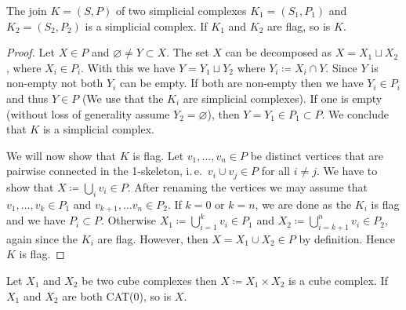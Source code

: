 \begin{lemma}
  \label{lem:flag}
  The join \(K = (S,P)\) of two simplicial complexes \(K_1 = (S_1, P_1)\) and \(K_2 = (S_2, P_2)\) is a simplicial complex. If \(K_1\) and \(K_2\) are flag, so is \(K\).
\end{lemma}

\begin{proof}
  Let \(X \in P\) and \(\varnothing \neq Y \subset X\). The set \(X\) can be decomposed as \(X = X_1 \sqcup X_2\), where \(X_i \in P_i\). With this we have \(Y = Y_1 \sqcup Y_2\) where \(Y_i \coloneqq X_i \cap Y\). Since \(Y\) is non-empty not both \(Y_i\) can be empty. If both are non-empty then we have \(Y_i \in P_i\) and thus \(Y \in P\) (We use that the \(K_i\) are simplicial complexes). If one is empty (without loss of generality assume \(Y_2 = \varnothing\)), then \(Y = Y_1 \in P_1 \subset P\). We conclude that \(K\) is a simplicial complex.

  We will now show that \(K\) is flag. Let \(v_1, \dots, v_n \in P\) be distinct vertices that are pairwise connected in the 1-skeleton, i.\,e.\ \(v_i \cup v_j \in P\) for all \(i \neq j\). We have to show that \(X \coloneqq \bigcup_i v_i \in P\). After renaming the vertices we may assume that \(v_1, \dots, v_k \in P_1\) and \(v_{k+1}, \dots v_{n} \in P_2\). If \(k=0\) or \(k=n\), we are done as the \(K_i\) is flag and we have \(P_i \subset P\). Otherwise \(X_1 \coloneqq \bigcup_{i=1}^kv_i \in P_1\) and \(X_2 \coloneqq \bigcup_{i=k+1}^n v_i \in P_2\), again since the \(K_i\) are flag. However, then \(X = X_1 \cup X_2 \in P\) by definition. Hence \(K\) is flag.
\end{proof}

\begin{prop}
  \label{prop:product-cat}
  Let \(X_1\) and \(X_2\) be two cube complexes then \(X \coloneqq X_1 \times X_2\) is a cube complex. If \(X_1\) and \(X_2\) are both CAT(0), so is \(X\).
\end{prop}

